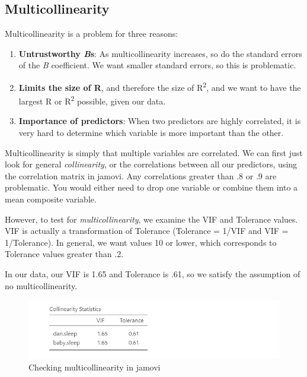 \documentclass[
]{book}
\providecommand{\tightlist}{%
  \setlength{\itemsep}{0pt}\setlength{\parskip}{0pt}}
\begin{document}
\hypertarget{multicollinearity}{%
\subsection{Multicollinearity}\label{multicollinearity}}

Multicollinearity is a problem for three reasons:

\begin{enumerate}
\def\labelenumi{\arabic{enumi}.}
\tightlist
\item
  \textbf{Untrustworthy \emph{B}s}: As multicollinearity increases, so do the standard errors of the \emph{B} coefficient. We want smaller standard errors, so this is problematic.
\item
  \textbf{Limits the size of R}, and therefore the size of R\textsuperscript{2}, and we want to have the largest R or R\textsuperscript{2} possible, given our data.
\item
  \textbf{Importance of predictors}: When two predictors are highly correlated, it is very hard to determine which variable is more important than the other.
\end{enumerate}

Multicollinearity is simply that multiple variables are correlated. We can first just look for general \emph{collinearity}, or the correlations between all our predictors, using the correlation matrix in jamovi. Any correlations greater than .8 or .9 are problematic. You would either need to drop one variable or combine them into a mean composite variable.

However, to test for \emph{multicollinearity}, we examine the VIF and Tolerance values. VIF is actually a transformation of Tolerance (Tolerance = 1/VIF and VIF = 1/Tolerance). In general, we want values 10 or lower, which corresponds to Tolerance values greater than .2.

In our data, our VIF is 1.65 and Tolerance is .61, so we satisfy the assumption of no multicollinearity.

\begin{figure}

{\centering \includegraphics[width=1\linewidth]{images/13-regression/regression-multicollinearity} 

}

\caption{Checking multicollinearity in jamovi}\label{fig:unnamed-chunk-10}
\end{figure}
\end{document}
